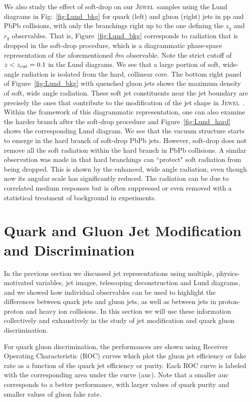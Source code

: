 \documentclass[notoc,preprintnumbers]{JHEP3}
\newcommand{\jw}{\textsc{Jewel}~}
\begin{document}
We also study the effect of soft-drop on our \jw samples using the Lund diagrams in Fig:~\ref{fig:Lund_bkg} for quark (left) and gluon (right) jets in pp and PbPb collisions, with only the branchings right up to the one defining the $z_g$ and $r_g$ observables. That is, Figure~\ref{fig:Lund_bkg} corresponds to radiation that is dropped in the soft-drop procedure, which is a diagrammatic phase-space representation of the aforementioned $\delta m$ observable. Note the strict cutoff of $z < z_{\rm cut} = 0.1$ in the Lund diagrams. We see that a large portion of soft, wide-angle radiation is isolated from the hard, collinear core. The bottom right panel of Figure~\ref{fig:Lund_bkg} with quenched gluon jets shows the maximum density of soft, wide angle radiation. These soft jet constituents near the jet boundary are precisely the ones that contribute to the modification of the jet shape in \jw \cite{KunnawalkamElayavalli:2017hxo}. Within the framework of this diagrammatic representation, one can also examine the harder branch after the soft-drop procedure and Figure~\ref{fig:Lund_hard} shows the corresponding Lund diagram. We see that the vacuum structure starts to emerge in the hard branch of soft-drop PbPb jets. However, soft-drop does not remove all the soft radiation within the hard branch in PbPb collisions. A similar observation was made in \cite{Hoang:2017kmk} that hard branchings can ``protect" soft radiation from being dropped. This is shown by the enhanced, wide angle radiation, even though now its angular scale has significantly reduced. The radiation can be due to correlated medium responses but is often suppressed or even removed with a statistical treatment of background in experiments.

\section{Quark and Gluon Jet Modification and Discrimination}
\label{sec:results}

In the previous section we discussed jet representations using multiple, physics-motivated variables, jet images, telescoping deconstruction and Lund diagrams, and we showed how individual observables can be used to highlight the differences between quark jets and gluon jets, as well as between jets in proton-proton and heavy ion collisions. In this section we will use these information collectively and exhaustively in the study of jet modification and quark gluon discrimination.

For quark gluon discrimination, the performances are shown using Receiver Operating Characteristic (ROC) curves which plot the gluon jet efficiency or fake rate as a function of the quark jet efficiency or purity. Each ROC curve is labeled with the corresponding area under the curve (auc). Note that a smaller auc corresponds to a better performance, with larger values of quark purity and smaller values of gluon fake rate.
\end{document}
